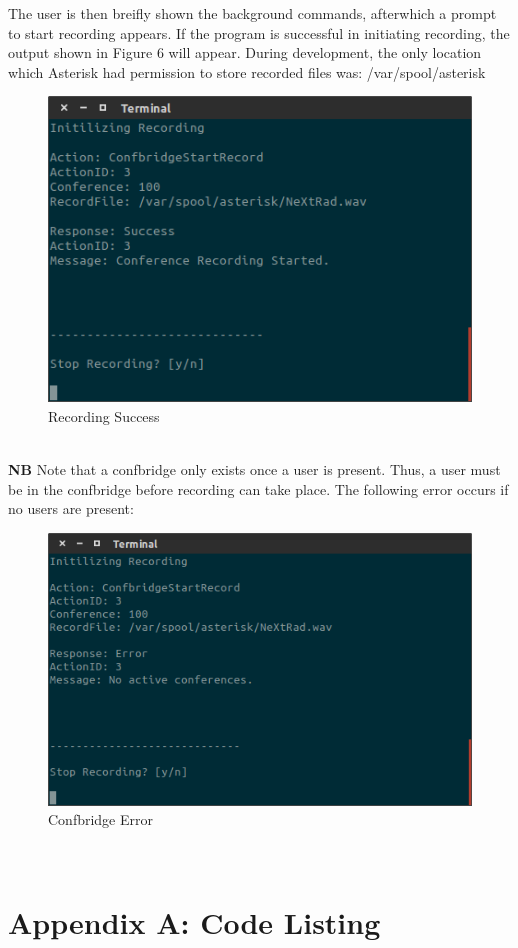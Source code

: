\documentclass[a4paper,11pt]{report}
\begin{document}
The user is then breifly shown the background commands, afterwhich a prompt to start recording appears. If the program is successful in initiating recording, the output shown in Figure 6 will appear. During development, the only location which Asterisk had permission to store recorded files was: /var/spool/asterisk
\begin{figure}[h]
  \begin{center}
    \includegraphics[scale = 0.5]{stop}
    \caption{Recording Success}
  \end{center}
\end{figure}\\
\textbf{NB} Note that a confbridge only exists once a user is present. Thus, a user must be in the confbridge before recording can take place. The following error occurs if no users are present:
\begin{figure}[h]
  \begin{center}
    \includegraphics[scale = 0.5]{confbridge_error}
    \caption{Confbridge Error}
  \end{center}
\end{figure}\\

\newpage
\section*{Appendix A: Code Listing}

\lstset{escapechar=@,style=customc}

\end{document}
